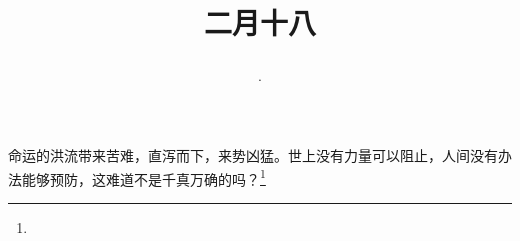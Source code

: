 \title{\date[d=27,m=3,y=2024][year:cn-y,年,month:cn,day:cn,日,·,weekday]·二月十八 }
命运的洪流带来苦难，直泻而下，来势凶猛。世上没有力量可以阻止，人间没有办法能够预防，这难道不是千真万确的吗？\footnote{ }

